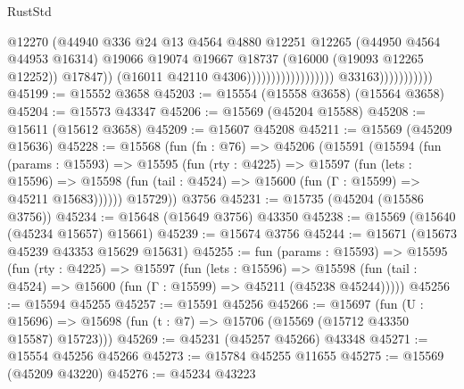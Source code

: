 \begin{lexlean}{RustStd}
\begin{coremodule}
                                                              @12270
                                                              (@44940
                                                                @336
                                                                @24
                                                                @13
                                                                @4564
                                                                @4880
                                                                @12251
                                                                @12265
                                                                (@44950 @4564 @44953 @16314)
                                                                @19066
                                                                @19074
                                                                @19667
                                                                @18737
                                                                (@16000 (@19093 @12265 @12252))
                                                                @17847))
                                                            (@16011 @42110 @4306))))))))))))))))))
                          @33163)))))))))))
@45199 := @15552 @3658
@45203 := @15554 (@15558 @3658) (@15564 @3658)
@45204 := @15573 @43347
@45206 := @15569 (@45204 @15588)
@45208 := @15611 (@15612 @3658)
@45209 := @15607 @45208
@45211 := @15569 (@45209 @15636)
@45228 := @15568
    (fun (fn : @76) =>
    @45206
      (@15591
        (@15594
          (fun (params : @15593) =>
          @15595
            (fun (rty : @4225) =>
            @15597
              (fun (lets : @15596) =>
              @15598 (fun (tail : @4524) => @15600 (fun (Γ : @15599) => @45211 @15683))))))
        @15729))
    @3756
@45231 := @15735 (@45204 (@15586 @3756))
@45234 := @15648 (@15649 @3756) @43350
@45238 := @15569 (@15640 (@45234 @15657) @15661)
@45239 := @15674 @3756
@45244 := @15671 (@15673 @45239 @43353 @15629 @15631)
@45255 := fun (params : @15593) =>
  @15595
    (fun (rty : @4225) =>
    @15597
      (fun (lets : @15596) =>
      @15598 (fun (tail : @4524) => @15600 (fun (Γ : @15599) => @45211 (@45238 @45244)))))
@45256 := @15594 @45255
@45257 := @15591 @45256
@45266 := @15697
    (fun (U : @15696) => @15698 (fun (t : @7) => @15706 (@15569 (@15712 @43350 @15587) @15723)))
@45269 := @45231 (@45257 @45266) @43348
@45271 := @15554 @45256 @45266
@45273 := @15784 @45255 @11655
@45275 := @15569 (@45209 @43220)
@45276 := @45234 @43223

\end{coremodule}
\end{lexlean}
